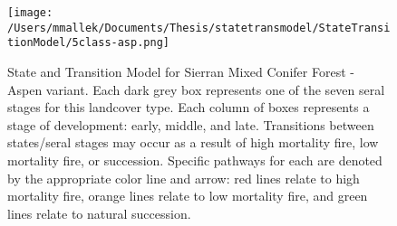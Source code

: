 \begin{figure}[htbp]
\centering
\texttt{[image: /Users/mmallek/Documents/Thesis/statetransmodel/StateTransitionModel/5class-asp.png]}
\caption{State and Transition Model for Sierran Mixed Conifer Forest - Aspen variant. Each dark grey box represents one of the seven seral stages for this landcover type. Each column of boxes represents a stage of development: early, middle, and late. Transitions between states/seral stages may occur as a result of high mortality fire, low mortality fire, or succession. Specific pathways for each are denoted by the appropriate color line and arrow: red lines relate to high mortality fire, orange lines relate to low mortality fire, and green lines relate to natural succession.} 
\label{transmodel_rfr-asp}
\end{figure}

